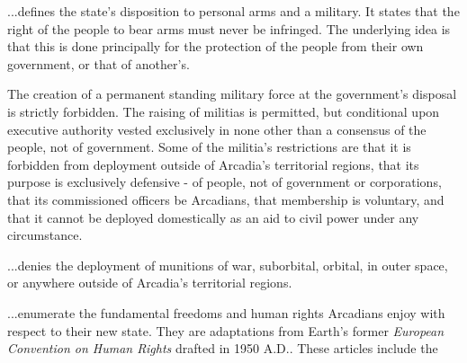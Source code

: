 \item %

...defines the state's disposition to personal arms and a military. It states that the right of the people to bear arms must never be infringed. The underlying idea is that this is done principally for the protection of the people from their own government, or that of another's.

The creation of a permanent standing military force at the government's disposal is strictly forbidden. The raising of militias is permitted, but conditional upon executive authority vested exclusively in none other than a consensus of the people, not of government. Some of the militia's restrictions are that it is forbidden from deployment outside of Arcadia's territorial regions, that its purpose is exclusively defensive - of people, not of government or corporations, that its commissioned officers be Arcadians, that membership is voluntary, and that it cannot be deployed domestically as an aid to civil power under any circumstance.

\item %

...denies the deployment of munitions of war, suborbital, orbital, in outer space, or anywhere outside of Arcadia's territorial regions.
\stoparticle

\startarticle[start=11]
\item %

...enumerate the fundamental freedoms and human rights Arcadians enjoy with respect to their new state. They are adaptations from Earth's former {\it European Convention on Human Rights} drafted in 1950 A.D.. These articles include the

